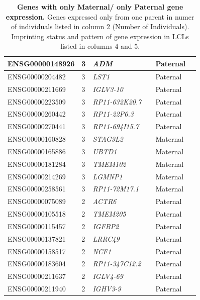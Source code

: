 \begin{table}[!htb]
\begin{adjustbox}{width={\textwidth}}
\begin{tabular}{@{}p{4cm}p{3cm}p{3cm}p{3cm}p{3cm}p{3cm}@{}}
ENSG00000148926 & 3 & \emph{ADM} & &  Paternal &   \\ \hline
ENSG00000204482 & 3 & \emph{LST1} & &  Paternal &   \\ \hline
ENSG00000211669 & 3 & \emph{IGLV3-10} & &  Paternal &   \\ \hline
ENSG00000223509 & 3 & \emph{RP11-632K20.7} & &  Paternal &   \\ \hline
ENSG00000260442 & 3 & \emph{RP11-22P6.3} & & Paternal &   \\ \hline
ENSG00000270441 & 3 & \emph{RP11-694I15.7} & &  Paternal &   \\ \hline
ENSG00000160828 & 3 & \emph{STAG3L2} & &  Maternal &   \\ \hline
ENSG00000165886 & 3 & \emph{UBTD1} & & Maternal &   \\ \hline
ENSG00000181284 & 3 & \emph{TMEM102} & &  Maternal &   \\ \hline
ENSG00000214269 & 3 & \emph{LGMNP1} & &  Maternal &   \\ \hline
ENSG00000258561 & 3 & \emph{RP11-72M17.1}& &  Maternal &   \\ \hline
ENSG00000075089 & 2 & \emph{ACTR6} & &  Paternal &   \\ \hline
ENSG00000105518 & 2 & \emph{TMEM205} & &  Paternal &   \\ \hline
ENSG00000115457 & 2 & \emph{IGFBP2} & &  Paternal &   \\ \hline
ENSG00000137821 & 2 & \emph{LRRC49} & &  Paternal &   \\ \hline
ENSG00000158517 & 2 & \emph{NCF1} & &  Paternal &   \\ \hline
ENSG00000183604 & 2 & \emph{RP11-347C12.2}& &  Paternal &   \\ \hline
ENSG00000211637 & 2 & \emph{IGLV4-69} & & Paternal &   \\ \hline
ENSG00000211940 & 2 & \emph{IGHV3-9} & &  Paternal &  \\ \hline
\end{tabular}
\end{adjustbox}
\caption[Genes with only Maternal/ only Paternal gene expression. ]{\textbf{Genes with only Maternal/ only Paternal gene expression. } Genes expressed only from one parent in numer of individuals listed in column 2 (Number of Individuals). Imprinting status and pattern of gene expression in LCLs listed in columns 4 and 5.}
\label{tab:oneparentexpression1}
\end{table}


